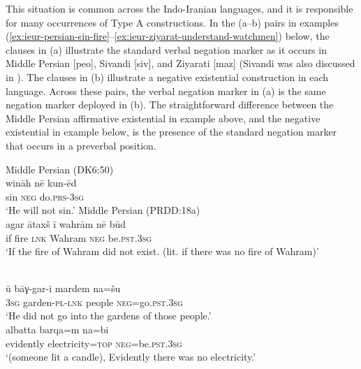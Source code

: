 ﻿\documentclass[output=paper]{langsci/langscibook}
\begin{document}
\begin{exe}
{This situation is common across the Indo-Iranian languages, and it is
responsible for many occurrences of Type A constructions. In the (a--b)
pairs in examples
(\ref{ex:ieur-persian-sin-fire}--\ref{ex:ieur-ziyarat-understand-watchmen})
below, the clauses in (a) illustrate the standard verbal negation marker as
it occurs in Middle Persian [peo], Sivandi [siv],
and Ziyarati [maz]
(Sivandi was also discussed in ). The clauses in (b)
illustrate a negative existential construction in each language. Across
these pairs, the verbal negation marker in (a) is the same negation marker
deployed in (b). The straightforward difference between the Middle
Persian
affirmative existential in example  above, and
the negative existential in example  below, is
the presence of the standard negation marker that occurs in a preverbal
position.
%
\begin{exe}\ex\label{ex:ieur-persian-sin-fire}
\begin{xlist}
\ex
Middle Persian (DK6:50)\\
    \gll wināh nē    kun-ēd \\
sin \textsc{neg} do.\textsc{prs}-\textsc{3sg} \\
    \glt
`He will not sin.'
\ex\label{ex:ieur-persian-fire}
Middle Persian (PRDD:18a)\\
\gll agar ātaxš ī        wahrām  nē     būd\\
if fire \textsc{lnk} Wahram \textsc{neg}  be.\textsc{pst}.\textsc{3sg}\\
\glt `If the fire of Wahram did not exist. (lit. if there was no fire of Wahram)'
\end{xlist}
\ex\begin{xlist}
\ex\label{ex:ieur-sivandi-gardens}
\\
    \gll ū bāγ-gar-i mardem na=šu \\
\textsc{3sg} garden-\textsc{pl}-\textsc{lnk}   people    \textsc{neg}=go.\textsc{pst}.\textsc{3sg} \\
    \glt `He did not go into the gardens of those people.'
\ex
  \\
\gll albatta   barqa=m      na=bi\\
evidently electricity=\textsc{top}
\textsc{neg}=be.\textsc{pst}.\textsc{3sg}\\
\glt `(someone lit a candle), Evidently there was no electricity.'

\end{xlist}
\end{exe}}
\end{exe}
\end{document}
